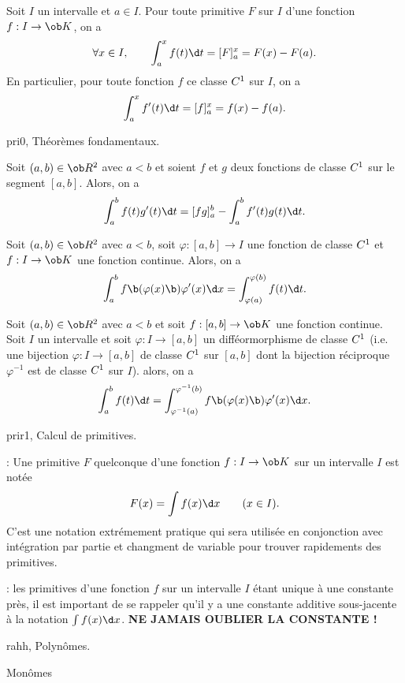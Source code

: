 \Propriete []  Soit $I$ un intervalle et $a\in I$. Pour toute primitive $F$ sur $I$ d'une fonction $f:I\to\ob K$, on a 
$$
\forall x\in I, \qquad \int_a^x f(t)\d t=[F]_a^x=F(x)-F(a). 
$$
En particulier, pour toute fonction $f$ ce classe $\sc C^1$ sur $I$, on a 
$$
\int_a^xf'(t)\d t=[f]_a^x=f(x)-f(a). 
$$

\Subsection pri0, Th\'eor\`emes fondamentaux. 

\Theoreme [Index=Theoreme@Th\'eor\`eme!Integration par partie@Int\'egration par partie;Title=Int\'egration par partie]
Soit $(a,b)\in\ob R^2$ avec $a< b$ et soient $f$ et $g$ deux fonctions de classe $\sc C^1$ sur le segment $[a,b]$. Alors, on a 
$$
\int_a^bf(t)g'(t)\d t=[fg]_a^b-\int_a^bf'(t)g(t)\d t. 
$$

\Theoreme [Index=Theoreme@Th\'eor\`eme!de changement de variable;Title=Changement de variable]
Soit $(a,b)\in\ob R^2$ avec $a< b$, soit $\varphi:[a,b]\to I$ une fonction de classe $\sc C^1$ et $f:I\to\ob K$ une fonction continue. Alors, on a 
$$
\int_a^bf\b(\varphi(x)\b)\varphi'(x)\d x=\int_{\varphi(a)}^{\varphi(b)}f(t)\d t.
$$

\Theoreme [Index=Theoreme@Th\'eor\`eme!de changement de variable;Title=Changement de variable] 
Soit $(a,b)\in\ob R^2$ avec $a<b$ et soit $f:[a,b]\to\ob K$ une fonction continue. Soit $I$ un intervalle et soit $\varphi:I\to[a,b]$ un diff\'eormorphisme de classe $\sc C^1$ (i.e. une bijection $\varphi:I\to[a,b]$ de classe $\sc C^1$ sur $[a,b]$ dont la bijection r\'eciproque $\varphi^{-1}$ est de classe $\sc C^1$ sur $I$). alors, 
on a 
$$
\int_a^bf(t)\d t=\int_{\varphi^{-1}(a)}^{\varphi^{-1}(b)}f\b(\varphi(x)\b)\varphi'(x)\d x. 
$$

\Section prir1, Calcul de primitives. 

\Remarque : Une primitive $F$ quelconque d'une fonction $f:I\to\ob K$ sur un intervalle $I$ est not\'ee
$$
F(x)=\int f(x)\d x\qquad (x\in I).
$$
C'est une notation extr\'emement pratique qui sera utilis\'ee en conjonction avec int\'egration par partie et changment de variable pour trouver rapidements des primitives. 
\bigskip

\Remarque : les primitives d'une fonction $f$ sur un intervalle $I$ \'etant unique \`a une constante pr\`es, il est important de se rappeler qu'il y a une constante additive sous-jacente \`a la notation $\int f(x)\d x$. 
{\bf NE JAMAIS OUBLIER LA CONSTANTE ! }
\bigskip

\Subsection rahh, Polyn\^omes.

\Concept [Index=Primitives!des fonctions du type@des fonctions du type $x^n$] Mon\^omes

